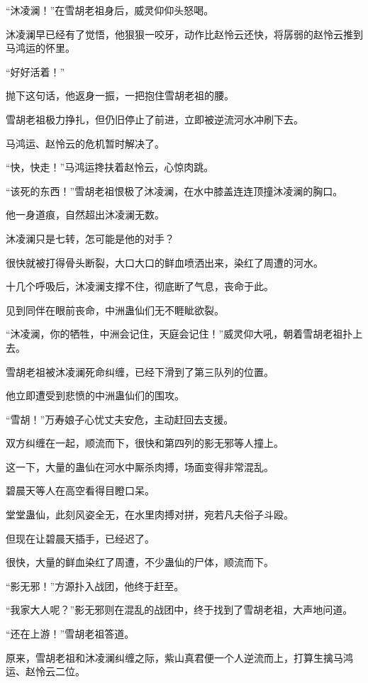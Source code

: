 
\begin{this_body}

“沐凌澜！”在雪胡老祖身后，威灵仰仰头怒喝。

沐凌澜早已经有了觉悟，他狠狠一咬牙，动作比赵怜云还快，将孱弱的赵怜云推到马鸿运的怀里。

“好好活着！”

抛下这句话，他返身一振，一把抱住雪胡老祖的腰。

雪胡老祖极力挣扎，但仍旧停止了前进，立即被逆流河水冲刷下去。

马鸿运、赵怜云的危机暂时解决了。

“快，快走！”马鸿运搀扶着赵怜云，心惊肉跳。

“该死的东西！”雪胡老祖恨极了沐凌澜，在水中膝盖连连顶撞沐凌澜的胸口。

他一身道痕，自然超出沐凌澜无数。

沐凌澜只是七转，怎可能是他的对手？

很快就被打得骨头断裂，大口大口的鲜血喷洒出来，染红了周遭的河水。

十几个呼吸后，沐凌澜支撑不住，彻底断了气息，丧命于此。

见到同伴在眼前丧命，中洲蛊仙们无不睚眦欲裂。

“沐凌澜，你的牺牲，中洲会记住，天庭会记住！”威灵仰大吼，朝着雪胡老祖扑上去。

雪胡老祖被沐凌澜死命纠缠，已经下滑到了第三队列的位置。

他立即遭受到悲愤的中洲蛊仙们的围攻。

“雪胡！”万寿娘子心忧丈夫安危，主动赶回去支援。

双方纠缠在一起，顺流而下，很快和第四列的影无邪等人撞上。

这一下，大量的蛊仙在河水中厮杀肉搏，场面变得非常混乱。

碧晨天等人在高空看得目瞪口呆。

堂堂蛊仙，此刻风姿全无，在水里肉搏对拼，宛若凡夫俗子斗殴。

但现在让碧晨天插手，已经迟了。

很快，大量的鲜血染红了周遭，不少蛊仙的尸体，顺流而下。

“影无邪！”方源扑入战团，他终于赶至。

“我家大人呢？”影无邪则在混乱的战团中，终于找到了雪胡老祖，大声地问道。

“还在上游！”雪胡老祖答道。

原来，雪胡老祖和沐凌澜纠缠之际，紫山真君便一个人逆流而上，打算生擒马鸿运、赵怜云二位。


\end{this_body}
